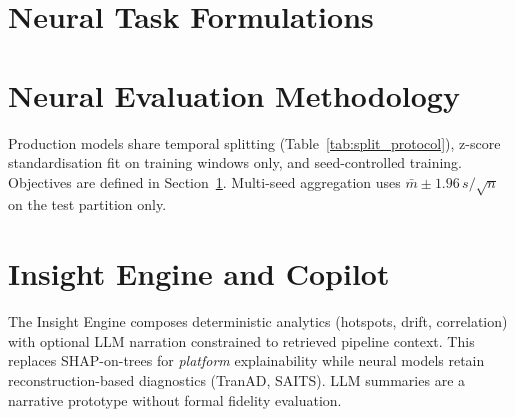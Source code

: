 \section{Neural Task Formulations}
\label{sec:neural_formulations}



\section{Neural Evaluation Methodology}

Production models share temporal splitting (Table~\ref{tab:split_protocol}), z-score standardisation fit on training windows only, and seed-controlled training. Objectives are defined in Section~\ref{sec:neural_formulations}. Multi-seed aggregation uses $\bar{m} \pm 1.96\,s/\sqrt{n}$ on the test partition only.

\section{Insight Engine and Copilot}

The Insight Engine composes deterministic analytics (hotspots, drift, correlation) with optional LLM narration constrained to retrieved pipeline context. This replaces SHAP-on-trees for \emph{platform} explainability while neural models retain reconstruction-based diagnostics (TranAD, SAITS). LLM summaries are a narrative prototype without formal fidelity evaluation.
